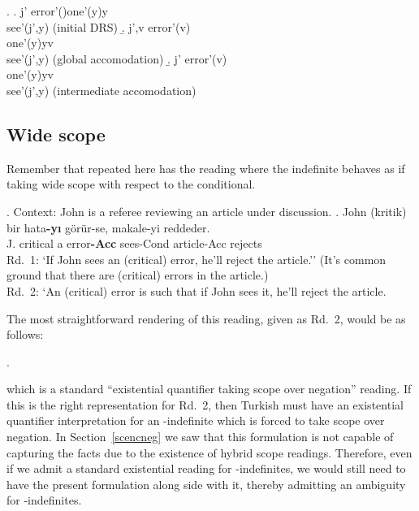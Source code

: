 \documentclass[11pt,a4paper]{article}
\begin{document}
\ex.
\a.
\udrs%
{j'}
{
		\udrs[\Diamond]%
		{}
		{
				{
						error'()\quad one'(y)\quad y\subseteq {} \\
						see'(j',y)
				}
		}
}\hfill (initial DRS)
\b.
\udrs%
{j',v}
{
		error'(v)\\
		\udrs[\Diamond]%
		{}
		{
				{
						one'(y)\quad y\subseteq v \\
						see'(j',y)
				}
		}
}\hfill (global accomodation)
\b.
\udrs%
{j'}
{
		{
				error'(v)\\
				{
						one'(y)\quad y\subseteq v \\
						see'(j',y)
				}
		}
}\hfill (intermediate accomodation)


\subsection{Wide scope}
\label{scwide}
 
Remember that  repeated here has the reading where the indefinite behaves as if taking wide scope with respect to the conditional.

\ex.\label{excondrr}%
Context: John is a referee reviewing an article under discussion.
\ag.\label{excondarr}%
	John (kritik) bir hata{\bf-yı} görür-se, makale-yi reddeder.\\
	J. critical a error{\bf-Acc} sees-Cond article-Acc rejects\\
	Rd.\ 1: `If John sees an (critical) error, he'll reject the article.'' (It's
	common ground that there are (critical) errors in the article.)\\
	Rd.\ 2: `An (critical) error is such that if John sees it, he'll reject the
	article.




The most straightforward rendering of this reading, given as Rd.\ 2,
would be as follows:

\ex.

which is a standard ``existential quantifier taking scope over
negation'' reading. If this is the right representation for Rd.\ 2,
then Turkish must have an existential quantifier interpretation for an
\acc-indefinite which is forced to take scope over negation. In
Section~\ref{scencneg} we saw that this formulation is not capable of
capturing the facts due to the existence of hybrid scope readings.
Therefore, even if we admit a standard existential reading for
\acc-indefinites, we would still need to have the present formulation
along side with it, thereby admitting an ambiguity for
\acc-indefinites.
\end{document}

